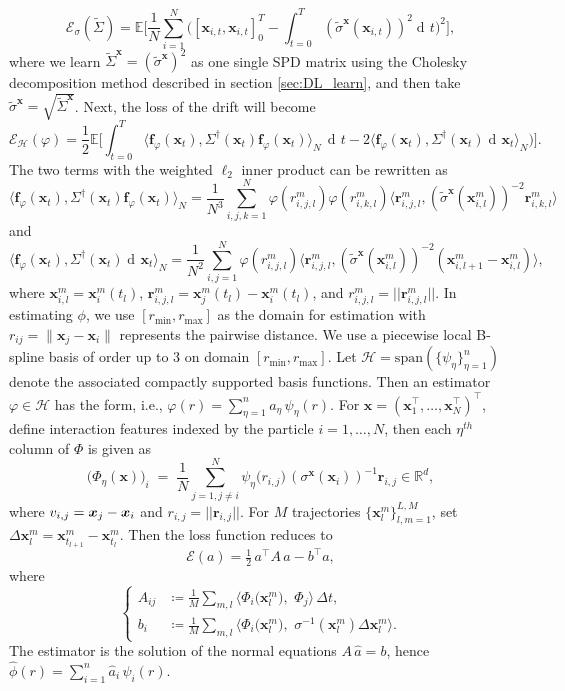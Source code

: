 \documentclass[11pt]{article} %
\def\rv{{\textnormal{v}}}
\def\rvx{{\mathbf{x}}}
\def\vf{{\bm{f}}}
\def\vr{{\bm{r}}}
\def\vx{{\bm{x}}}
\def\gH{{\mathcal{H}}}
\newcommand{\E}{\mathbb{E}}
\newcommand{\R}{\mathbb{R}}
\DeclareMathOperator{\dif}{d \!}        %
\newcommand{\dt}{\dif t}
\newcommand{\norm}[1]{||#1||}
\newcommand{\loss}{\mathcal{E}}
\begin{document}
\[
\mathcal{E}_{\sigma}(\tilde \Sigma) = \E\Big[\frac{1}{N}\sum_{i = 1}^N\big([\rvx_{i, t}, \rvx_{i, t}]_0^T - \int_{t=0}^T (\tilde\sigma^\vx(\rvx_{i, t}))^2\dt\big)^2\Big],
\]
where we learn $\tilde\Sigma^\vx = (\tilde\sigma^\vx)^2$ as one single SPD matrix using the Cholesky decomposition method described in section \ref{sec:DL_learn}, and then take $\tilde\sigma^\vx = \sqrt{\tilde\Sigma^\vx}$. Next, the loss of the drift will become
\[
\loss_{\gH}(\varphi) = \frac{1}{2}\E\Big[\int_{t = 0}^T\langle\vf_\varphi(\rvx_t), \Sigma^{\dagger}(\rvx_t)\vf_\varphi(\rvx_t)\rangle_N \, \dt - 2\langle\vf_\varphi(\rvx_t), \Sigma^{\dagger}(\rvx_t)\dif \rvx_t\rangle_N\big)\Big].
\]
The two terms with the weighted $\ell_2$ inner product can be rewritten as
\[
\langle\vf_\varphi(\rvx_t), \Sigma^{\dagger}(\rvx_t)\vf_\varphi(\rvx_t)\rangle_N = \frac{1}{N^3}\sum_{i, j, k = 1}^N\varphi(r_{i, j, l}^m)\varphi(r_{i, k, l}^m)\langle\vr_{i, j, l}^m, (\tilde\sigma^\vx(\rvx_{i, l}^m))^{-2}\vr_{i, k, l}^m\rangle
\]
and
\[
\langle\vf_\varphi(\rvx_t), \Sigma^{\dagger}(\rvx_t)\dif \rvx_t\rangle_N = \frac{1}{N^2}\sum_{i, j = 1}^N\varphi(r_{i, j, l}^m)\langle\vr_{i, j, l}^m, (\tilde\sigma^\vx(\rvx_{i, l}^m))^{-2}(\rvx_{i, l + 1}^m - \rvx_{i, l}^m)\rangle,
\]
where $\rvx_{i, l}^m = \rvx_i^m(t_l)$, $\vr_{i, j, l}^m = \vx_j^m(t_l) - \vx_i^m(t_l)$, and $r_{i, j, l}^m = \norm{\vr_{i, j, l}^m}$.  In estimating $\phi$, we use \([r_{\min},r_{\max}]\) as the domain for estimation with \(r_{ij}=\|\rvx_j-\rvx_i\|\) represents the pairwise distance. We use a piecewise local B-spline basis of order up to \(3\) on domain \([r_{\min},r_{\max}]\).
Let \(\gH = \text{span}(\{\psi_\eta\}_{\eta=1}^{n})\) denote the associated compactly supported basis functions.
Then an estimator $\varphi \in \mathcal{H}$ has the form, i.e., $\varphi(r)=\sum_{\eta=1}^{n} a_\eta\,\psi_\eta(r)$.   For $\rvx=(\rvx_1^\top,\dots,\rvx_N^\top)^\top$, define interaction features indexed by the particle $i=1,\dots,N$, then each $\eta^{th}$ column of $\Phi$ is given as
\[
\big(\Phi_\eta(\vx)\big)_i \;=\; \frac{1}{N}\sum_{j = 1, j\neq i}^N\psi_\eta\!\big(r_{i, j}\big)\,(\sigma^{\vx}(\vx_i))^{-1}\vr_{i, j}\in\R^{d},
\]
where $\rv_{i, j} = \vx_j - \vx_i$ and $r_{i, j} = \norm{\vr_{i, j}}$. For $M$ trajectories $\{\rvx_l^m\}_{l, m = 1}^{L, M}$, set $\Delta \rvx^{m}_l=\rvx^{m}_{t_{l+1}}-\rvx^{m}_{t_l}$. Then the loss function reduces to
\[
\loss(a)=\tfrac12\,a^\top A\,a-b^\top a,
\]
where
\[
\begin{cases}
A_{ij} &\coloneqq \frac1{M}\sum_{m,l}
\langle \Phi_i\!\big(\rvx^{m}_{l}\big),\,
\,\Phi_j\!\rangle\,\Delta t,\\[0.5em]
b_i   &\coloneqq \frac1{M}\sum_{m,l}
\langle \Phi_i\!\big(\rvx^{m}_{l}\big),\,
\,\sigma^{-1}(\rvx_l^m)\Delta \rvx^{m}_l\rangle .
\end{cases}
\]
The estimator is the solution of the normal equations $A\,\hat a=b$, hence $\hat\phi(r)=\sum_{i=1}^{n}\hat a_i\,\psi_i(r)$.
%
\end{document}
